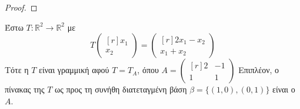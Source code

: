  \begin{proof}
 \end{proof}

 \begin{example}
   Έστω $ T \colon \mathbb{R}^{2} \to \mathbb{R}^{2} $ με 
   \[
   T \begin{pmatrix*}[r] x_{1} \\ x_{2} \end{pmatrix*} = 
   \begin{pmatrix*}[r] 2 x_{1}- x_{2} \\ x_{1}+ x_{2} \end{pmatrix*}
    \]  
    Τότε η $T$ είναι γραμμική αφού $ T = T_{A} $, όπου $ A = 
    \begin{pmatrix*}[r]
      2 & -1 \\
      1 & 1
    \end{pmatrix*} $
    Επιπλέον, ο πίνακας της $T$ ως προς τη συνήθη διατεταγμένη βάση $ \beta = \{ (1,0),
    (0,1) \} $ είναι ο $A$.
 \end{example}


